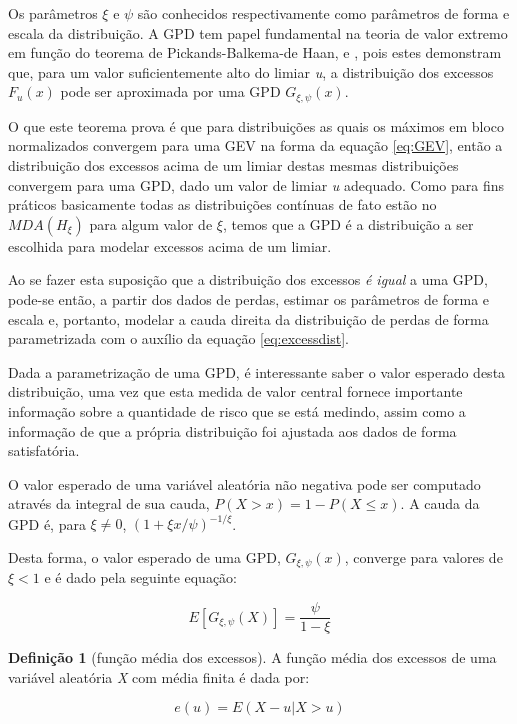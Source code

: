 \documentclass[review]{elsarticle}
\theoremstyle{definition}
\newtheorem{defi}[teor]{Definição}
\begin{document}
Os parâmetros $\xi$ e $\psi$ são conhecidos respectivamente como parâmetros de forma e escala da distribuição. A GPD tem papel fundamental na teoria de valor extremo em função do teorema de Pickands-Balkema-de Haan, \cite{Pickands1975} e \cite{Balkema1974}, pois estes demonstram que, para um valor suficientemente alto do limiar \emph{u}, a distribuição dos excessos $F_u(x)$ pode ser aproximada por uma GPD $G_{\xi,\psi}(x)$.

O que este teorema prova é que para distribuições as quais os máximos em bloco normalizados convergem para uma GEV na forma da equação \eqref{eq:GEV}, então a distribuição dos excessos acima de um limiar destas mesmas distribuições convergem para uma GPD, dado um valor de limiar \emph{u} adequado. Como para fins práticos basicamente todas as distribuições contínuas de fato estão no $MDA(H_\xi)$ para algum valor de $\xi$, temos que a GPD é a distribuição a ser escolhida para modelar excessos acima de um limiar.

Ao se fazer esta suposição que a distribuição dos excessos \emph{é igual} a uma GPD, pode-se então, a partir dos dados de perdas, estimar os parâmetros de forma e escala e, portanto, modelar a cauda direita da distribuição de perdas de forma parametrizada com o auxílio da equação \eqref{eq:excessdist}. 


Dada a parametrização de uma GPD, é interessante saber o valor esperado desta distribuição, uma vez que esta medida de valor central fornece importante informação sobre a quantidade de risco que se está medindo, assim como a informação de que a própria distribuição foi ajustada aos dados de forma satisfatória.

O valor esperado de uma variável aleatória não negativa pode ser computado através da integral de sua cauda, $P(X>x) = 1-P(X \leq x)$. A cauda da GPD é, para $\xi \neq 0$, $\left(1+\xi x / \psi \right)^{-1/ \xi}$.

Desta forma, o valor esperado de uma GPD, $G_{\xi,\psi}(x)$, converge para valores de $\xi<1$ e é dado pela seguinte equação:

\begin{equation}
\label{eq:meanGPD}
E\left[G_{\xi,\psi} (X) \right]=\frac{\psi}{1-\xi}
\end{equation}


\begin{defi}[função média dos excessos]
	\label{defi:meanexcess}
	A função média dos excessos de uma variável aleatória \emph{X} com média finita é dada por:

	\begin{equation}
	\label{eq:meanexcess}
	e(u)=E\left(X-u | X > u\right)
	\end{equation}
\end{defi}
\end{document}
